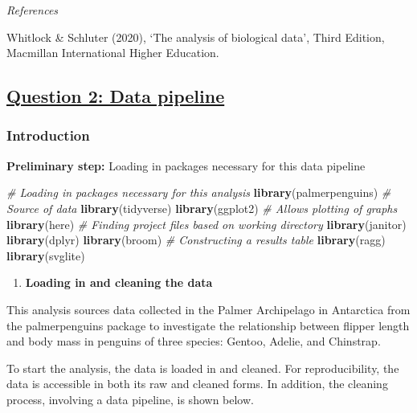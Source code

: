 \documentclass[
]{article}
\newenvironment{Shaded}{\begin{snugshade}}{\end{snugshade}}
\newcommand{\CommentTok}[1]{\textcolor[rgb]{0.56,0.35,0.01}{\textit{#1}}}
\newcommand{\FunctionTok}[1]{\textcolor[rgb]{0.13,0.29,0.53}{\textbf{#1}}}
\newcommand{\NormalTok}[1]{#1}
\providecommand{\tightlist}{%
  \setlength{\itemsep}{0pt}\setlength{\parskip}{0pt}}
\begin{document}
\emph{References}

Whitlock \& Schluter (2020), `The analysis of biological data', Third
Edition, Macmillan International Higher Education.

\subsection{\texorpdfstring{\ul{Question 2: Data
pipeline}}{Question 2: Data pipeline}}\label{question-2-data-pipeline}

\subsubsection{Introduction}\label{introduction}

\textbf{Preliminary step:} Loading in packages necessary for this data
pipeline

\begin{Shaded}
\begin{Highlighting}[]
\CommentTok{\# Loading in packages necessary for this analysis}
\FunctionTok{library}\NormalTok{(palmerpenguins) }\CommentTok{\# Source of data}
\FunctionTok{library}\NormalTok{(tidyverse)}
\FunctionTok{library}\NormalTok{(ggplot2) }\CommentTok{\# Allows plotting of graphs}
\FunctionTok{library}\NormalTok{(here) }\CommentTok{\# Finding project files based on working directory}
\FunctionTok{library}\NormalTok{(janitor)}
\FunctionTok{library}\NormalTok{(dplyr)}
\FunctionTok{library}\NormalTok{(broom) }\CommentTok{\# Constructing a results table}
\FunctionTok{library}\NormalTok{(ragg)}
\FunctionTok{library}\NormalTok{(svglite)}
\end{Highlighting}
\end{Shaded}

\begin{enumerate}
\def\labelenumi{\arabic{enumi}.}
\tightlist
\item
  \textbf{Loading in and cleaning the data}
\end{enumerate}

This analysis sources data collected in the Palmer Archipelago in
Antarctica from the palmerpenguins package to investigate the
relationship between flipper length and body mass in penguins of three
species: Gentoo, Adelie, and Chinstrap.

To start the analysis, the data is loaded in and cleaned. For
reproducibility, the data is accessible in both its raw and cleaned
forms. In addition, the cleaning process, involving a data pipeline, is
shown below.
\end{document}

